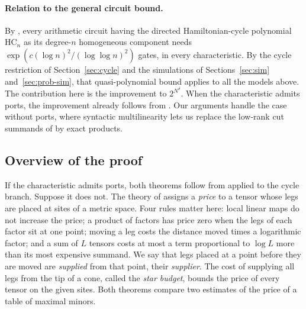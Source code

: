 \documentclass[11pt]{article}
\theoremstyle{remark}
\newcommand{\HC}{\mathrm{HC}}
\begin{document}
\paragraph{Relation to the general circuit bound.}
By \cite[Theorem 1.1]{hc}, every arithmetic circuit having
the directed Hamiltonian-cycle polynomial \(\HC_n\) as its degree-\(n\)
homogeneous component needs
\(\exp(c(\log n)^2/(\log\log n)^2)\) gates, in every characteristic. By the
cycle restriction of Section~\ref{sec:cycle} and the simulations of
Sections~\ref{sec:sim} and~\ref{sec:prob-sim}, that quasi-polynomial bound applies to all the
models above. The contribution here is the improvement to
\(2^{N^\delta}\). When the characteristic admits ports, the improvement
already follows from \cite[Theorem 12.2]{hc}. Our arguments handle the
case without ports, where syntactic multilinearity lets us replace the
low-rank cut summands of \cite[Lemma 3.3]{hc} by exact products.

\subsection{Overview of the proof}\label{sec:overview}
If the characteristic admits ports, both theorems follow from
\cite[Theorem 12.2]{hc} applied to the cycle branch. Suppose it does not.
The theory of \cite{hc} assigns a \emph{price} to a tensor whose legs
are placed at sites of a metric space. Four rules matter here: local
linear maps do not increase the price; a product of factors has price
zero when the legs of each factor sit at one point; moving a leg costs
the distance moved times a logarithmic factor; and a sum of \(L\) tensors
costs at most a term proportional to \(\log L\) more than its most
expensive summand. We say that legs placed at a point before they are
moved are \emph{supplied} from that point, their \emph{supplier}. The cost of supplying all legs
from the tip of a cone, called the \emph{star budget}, bounds the price
of every tensor on the given sites. Both theorems compare two estimates
of the price of a table of maximal minors.
\end{document}
